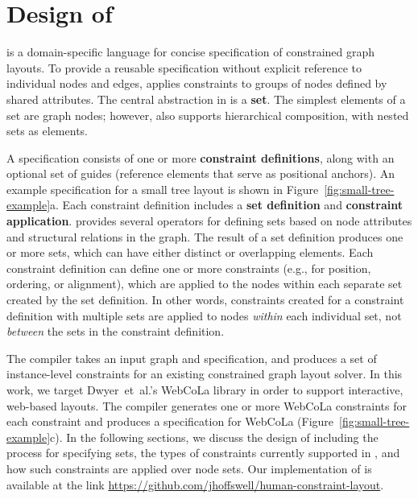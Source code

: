 \vspace{-1px}
\section{Design of \projectname}
\projectname is a domain-specific language for concise specification of 
constrained graph layouts. To provide a reusable specification 
without explicit reference to individual nodes and edges, \projectname
applies constraints to groups of nodes defined by shared attributes. 
The central abstraction in \projectname is a \textbf{set}. The 
simplest elements of a set are graph nodes; however, \projectname also
supports hierarchical composition, with nested sets as elements.

A \projectname specification consists of one or more \textbf{constraint definitions},
along with an optional set of guides (reference elements that serve as 
positional anchors). An example \projectname specification for a small tree 
layout is shown in Figure~\ref{fig:small-tree-example}a. Each constraint 
definition includes a \textbf{set definition} and \textbf{constraint application}.
\projectname provides several operators for defining
sets based on node attributes and structural relations in the graph.
The result of a set definition produces one or more sets, which 
can have either distinct or overlapping elements. Each constraint definition can 
define one or more constraints (e.g., for position, ordering, 
or alignment), which are applied to the nodes within each separate set created by the set definition. 
In other words, constraints created for a constraint definition with multiple sets are 
applied to nodes \emph{within} each individual set, not \emph{between} 
the sets in the constraint definition.

The \projectname compiler takes an input graph 
and specification, and produces a set of instance-level constraints for 
an existing constrained graph layout solver. In this work, we target 
Dwyer~et~al.'s WebCoLa library \cite{WebCoLa} in order to support
interactive, web-based layouts. The \projectname compiler generates one
or more WebCoLa constraints for each \projectname constraint and produces a
specification for WebCoLa (Figure~\ref{fig:small-tree-example}c).
 In the following sections, 
we discuss the design of \projectname including the process for 
specifying sets, the types of constraints currently supported in \projectname, 
and how such constraints are applied over node sets. 
Our implementation of \projectname is available at the link
{\small\url{https://github.com/jhoffswell/human-constraint-layout}}.

